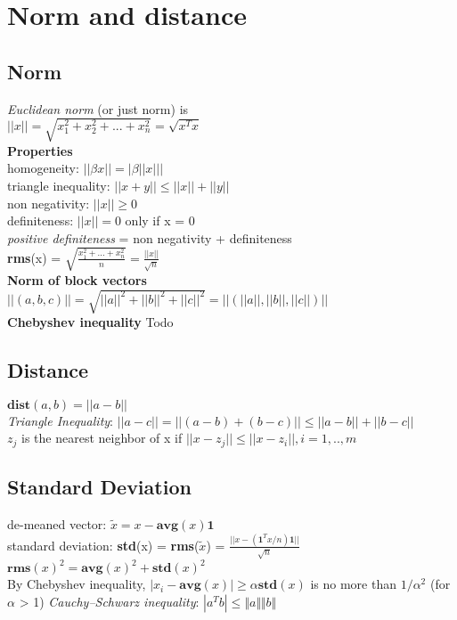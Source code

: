 \section{Norm and distance}
\subsection{Norm} 
\textit{Euclidean norm} (or just norm) is\\
$||x||= \sqrt{x_1^2+x_2^2+...+x_n^2}= \sqrt{x^Tx}$\\
\textbf{Properties}\\
\textbullet homogeneity: $||\beta x|| = |\beta ||x|||$\\
\textbullet triangle inequality: $||x + y|| \leq ||x|| + ||y||$\\
\textbullet non negativity: $||x|| \geq 0$\\
\textbullet definiteness: $||x|| = 0$ only if x = 0\\
\textit{positive definiteness} = non negativity + definiteness\\
\textbf{rms}(x) = $\sqrt{\frac{x_1^2+...+x_n^2}{n}} = \frac{||x||}{\sqrt{n}}$ \\
\textbf{Norm of block vectors}
$||(a,b,c)|| = \sqrt{||a||^2 + ||b||^2 + ||c||^2} = ||(||a||, ||b||, ||c||)||$\\
\textbf{Chebyshev inequality}
Todo
\subsection{Distance}
$\textbf{dist}(a,b) = ||a - b||$\\
\textit{Triangle Inequality}: $||a - c|| = ||(a - b) + (b - c)|| \leq ||a-b|| + ||b-c||$\\
$z_j$ is the nearest neighbor of x if $||x-z_j|| \leq ||x-z_i||, i=1,..,m$\\

\subsection{Standard Deviation}
de-meaned vector: $\tilde{x} = x - \textbf{avg}(x)\textbf{1}$\\
standard deviation: \textbf{std}(x) = \textbf{rms}($\tilde{x}$) = $\frac{||x - (\textbf{1}^Tx/n)\textbf{1}||}{\sqrt{n}}$\\
${\textbf{rms}(x)}^2 = {\textbf{avg}(x)}^2 + {\textbf{std}(x)}^2$\\
By Chebyshev inequality, $|x_i - \textbf{avg}(x)| \geq \alpha \textbf{std}(x)$ is no more than $1/\alpha^2$ (for 
$\alpha$ > 1)
\textit{Cauchy–Schwarz inequality}: $|a^Tb| \leq \Vert a\Vert \Vert b \Vert$
